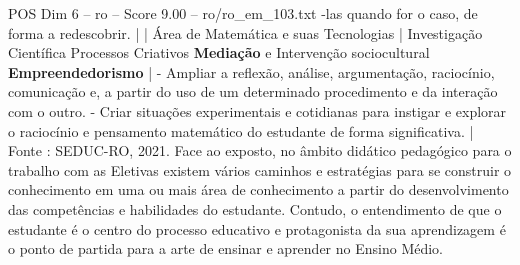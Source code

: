 \begin{textsample}{POS Dim 6 – ro – Score 9.00 – ro/ro\_em\_103.txt}
-las quando for o caso, de forma a redescobrir. | | Área de Matemática e suas Tecnologias | Investigação Científica Processos Criativos \textbf{Mediação} e Intervenção sociocultural \textbf{Empreendedorismo} | - Ampliar a reflexão, análise, argumentação, raciocínio, comunicação e, a partir do uso de um determinado procedimento e da interação com o outro. - Criar situações experimentais e cotidianas para instigar e explorar o raciocínio e pensamento matemático do estudante de forma significativa. | Fonte : SEDUC-RO, 2021.
Face ao exposto, no âmbito didático pedagógico para o trabalho com as Eletivas existem vários caminhos e estratégias para se construir o conhecimento em uma ou mais área de conhecimento a partir do desenvolvimento das competências e habilidades do estudante.
Contudo, o entendimento de que o estudante é o centro do processo educativo e protagonista da sua aprendizagem é o ponto de partida para a arte de ensinar e aprender no Ensino Médio.

\end{textsample}
